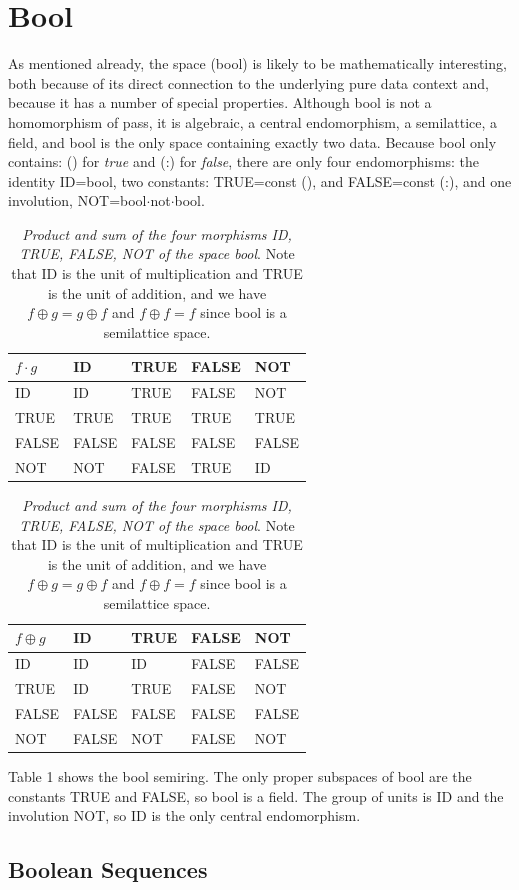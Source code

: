 \documentclass[11pt]{article}
\begin{document}
\section{Bool} 

      As mentioned already, the space (bool) is likely to be mathematically interesting, both because of its direct connection to 
the underlying pure data context and, because it has a number of special properties.  Although bool is not a homomorphism of pass,
it is algebraic, a central endomorphism, a semilattice, a field, and bool is the only space containing exactly two data. 
Because bool only contains:  () for {\it true} and (:) for {\it false}, there are only four endomorphisms:  
the identity ID=bool, two constants: TRUE=const (), and FALSE=const (:), and one involution, NOT=bool$\cdot$not$\cdot$bool.  
\begin{table}
\begin{tabular}{| l | l | l | l | l |  }
$f\cdot g$ & ID & TRUE & FALSE & NOT  \\
\hline
ID &  ID & TRUE & FALSE &  NOT \\
TRUE & TRUE & TRUE  & TRUE & TRUE \\
FALSE & FALSE  & FALSE & FALSE & FALSE   \\
NOT & NOT & FALSE & TRUE & ID \\
\hline
\end{tabular}
\begin{tabular}{| l | l | l | l | l |  }
$f\oplus g$ & ID & TRUE & FALSE & NOT  \\
\hline
ID &  ID & ID & FALSE & FALSE \\
TRUE & ID & TRUE  & FALSE & NOT \\
FALSE & FALSE  & FALSE & FALSE & FALSE   \\
NOT & FALSE & NOT & FALSE & NOT \\
\hline
\end{tabular}
\caption{{\it Product and sum of the four morphisms ID, TRUE, FALSE, NOT of the space bool}.  Note that ID is the unit of multiplication and TRUE is the 
unit of addition, and we have $f\oplus g=g\oplus f$ and $f\oplus f=f$ since bool is a semilattice space.}
\end{table}
Table 1 shows the bool semiring.  The only proper subspaces of bool are the constants TRUE and FALSE, so bool is a field. The group of units is ID and 
the involution NOT, so ID is the only central endomorphism.    

\subsection{Boolean Sequences}
\end{document}
